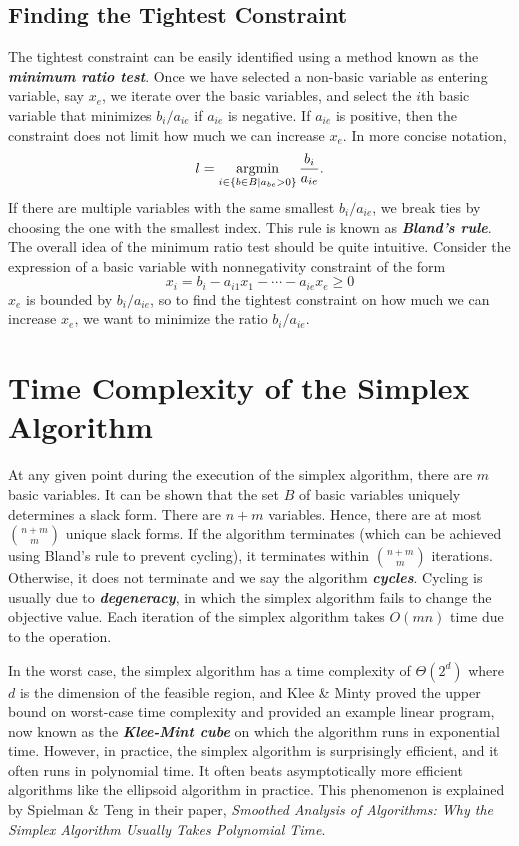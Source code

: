 \subsection{Finding the Tightest Constraint} 

The tightest constraint can be easily identified using a method known as the \textit{\textbf{minimum ratio test}}. Once we have selected a non-basic variable as entering variable, say $x_e$, we iterate over the basic variables, and select the $i$th basic variable that minimizes $b_i/a_{ie}$ if $a_{ie}$ is negative. If $a_{ie}$ is positive, then the constraint does not limit how much we can increase $x_e$. In more concise notation, 
$$
l = \operatorname*{\mathrm{argmin}}_{i \in \{b \in B \mid a_{be} > 0\}} \frac{b_i}{a_{ie}}.
$$
If there are multiple variables with the same smallest $b_i/a_{ie}$, we break ties by choosing the one with the smallest index. This rule is known as \textit{\textbf{Bland's rule}}. The overall idea of the minimum ratio test should be quite intuitive. Consider the expression of a basic variable with nonnegativity constraint of the form 
$$
x_i = b_i - a_{i1} x_1 - \cdots - a_{ie} x_e \geq 0
$$
$x_e$ is bounded by $b_i/a_{ie}$, so to find the tightest constraint on how much we can increase $x_e$, we want to minimize the ratio $b_i/a_{ie}$.

\section{Time Complexity of the Simplex Algorithm}

At any given point during the execution of the simplex algorithm, there are $m$ basic variables. It can be shown that the set $B$ of basic variables uniquely determines a slack form. There are $n+m$ variables. Hence, there are at most ${n+m \choose m}$ unique slack forms. If the algorithm terminates (which can be achieved using Bland's rule to prevent cycling), it terminates within ${n+m \choose m}$ iterations. Otherwise, it does not terminate and we say the algorithm \textit{\textbf{cycles}}. Cycling is usually due to \textit{\textbf{degeneracy}}, in which the simplex algorithm fails to change the objective value. Each iteration of the simplex algorithm takes $O(mn)$ time due to the  operation.

In the worst case, the simplex algorithm has a time complexity of $\Theta(2^d)$ where $d$ is the dimension of the feasible region, and Klee \& Minty proved the upper bound on worst-case time complexity and provided an example linear program, now known as the \textit{\textbf{Klee-Mint cube}} on which the algorithm runs in exponential time. However, in practice, the simplex algorithm is surprisingly efficient, and it often runs in polynomial time. It often beats asymptotically more efficient algorithms like the ellipsoid algorithm in practice. This phenomenon is explained by Spielman \& Teng in their paper, \textit{Smoothed Analysis of Algorithms: Why the Simplex Algorithm Usually Takes Polynomial Time}.